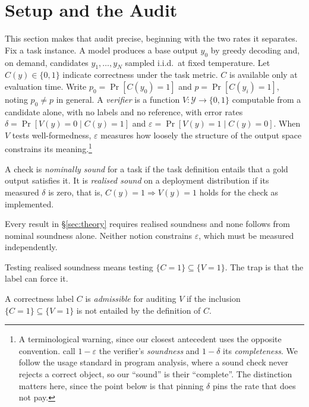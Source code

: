 \documentclass[11pt]{article}
\begin{document}
\section{Setup and the Audit}\label{sec:setup}
This section makes that audit precise, beginning with the two rates it
separates. Fix a task instance. A model produces a base output $y_0$ by greedy decoding
and, on demand, candidates $y_1,\dots,y_N$ sampled i.i.d.\ at fixed temperature.
Let $C(y)\in\{0,1\}$ indicate correctness under the task metric. $C$ is
available only at evaluation time. Write $p_0=\Pr[C(y_0)=1]$ and
$p=\Pr[C(y_i)=1]$, noting $p_0\neq p$ in general. A \emph{verifier} is a function $V:\mathcal{Y}\to\{0,1\}$ computable from a
candidate alone, with no labels and no reference, with error rates
$\delta=\Pr[V(y)=0\mid C(y)=1]$ and $\varepsilon=\Pr[V(y)=1\mid C(y)=0]$. When
$V$ tests well-formedness, $\varepsilon$ measures how loosely the structure of
the output space constrains its meaning.\footnote{A terminological warning,
since our closest antecedent uses the opposite convention.
\citet{stroebl2024verifier} call $1-\varepsilon$ the verifier's
\emph{soundness} and $1-\delta$ its \emph{completeness}. We follow the usage standard in program analysis, where a sound check never
rejects a correct object, so our ``sound'' is their ``complete''. The
distinction matters here, since the point below is that pinning $\delta$ pins
the rate that does not pay.}

\begin{definition}\label{def:sound}
A check is \emph{nominally sound} for a task if the task definition entails that
a gold output satisfies it. It is \emph{realised sound} on a deployment
distribution if its measured $\delta$ is zero, that is, $C(y)=1\Rightarrow
V(y)=1$ holds for the check as implemented.
\end{definition}

Every result in \S\ref{sec:theory} requires realised soundness and none follows
from nominal soundness alone. Neither notion constrains $\varepsilon$, which must
be measured independently.

Testing realised soundness means testing $\{C{=}1\}\subseteq\{V{=}1\}$. The
trap is that the label can force it.

\begin{definition}\label{def:admissible}
A correctness label $C$ is \emph{admissible} for auditing $V$ if the inclusion
$\{C{=}1\}\subseteq\{V{=}1\}$ is not entailed by the definition of $C$.
\end{definition}
\end{document}
